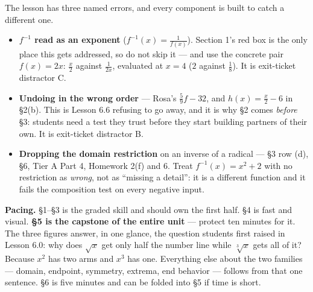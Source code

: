 \documentclass[10pt]{article}
\begin{document}
\begin{teachernote}
\small The lesson has three named errors, and every component is built to catch a different one.
\begin{itemize}[leftmargin=1.3em, nosep]
  \item \textbf{$f^{-1}$ read as an exponent} ($f^{-1}(x)=\frac{1}{f(x)}$). Section 1's red box is
        the only place this gets addressed, so do not skip it --- and use the concrete pair
        $f(x)=2x$: $\frac{x}{2}$ against $\frac{1}{2x}$, evaluated at $x=4$ ($2$ against $\frac18$).
        It is exit-ticket distractor C.
  \item \textbf{Undoing in the wrong order} --- Rosa's $\frac59f-32$, and $h(x)=\frac{x}{2}-6$ in
        \S2(b). This is Lesson 6.6 refusing to go away, and it is why \S2 comes \emph{before} \S3:
        students need a test they trust before they start building partners of their own. It is
        exit-ticket distractor B.
  \item \textbf{Dropping the domain restriction} on an inverse of a radical --- \S3 row (d),
        \S6, Tier A Part 4, Homework 2(f) and 6. Treat $f^{-1}(x)=x^{2}+2$ with no restriction as
        \emph{wrong}, not as ``missing a detail'': it is a different function and it fails the
        composition test on every negative input.
\end{itemize}
\textbf{Pacing.} \S1--\S3 is the graded skill and should own the first half. \S4 is fast and visual.
\textbf{\S5 is the capstone of the entire unit} --- protect ten minutes for it. The three figures
answer, in one glance, the question students first raised in Lesson 6.0: why does $\sqrt{x}$ get
only half the number line while $\sqrt[3]{x}$ gets all of it? Because $x^{2}$ has two arms and
$x^{3}$ has one. Everything else about the two families --- domain, endpoint, symmetry, extrema,
end behavior --- follows from that one sentence. \S6 is five minutes and can be folded into \S5 if
time is short.
\end{teachernote}
\end{document}
